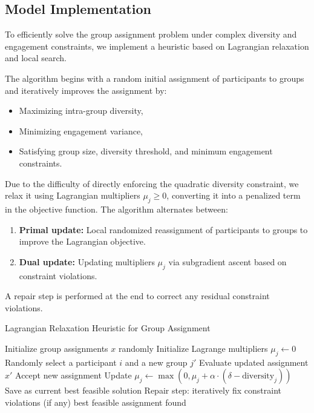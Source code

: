 \subsection*{Model Implementation}

To efficiently solve the group assignment problem under complex diversity and engagement constraints, we implement a heuristic based on Lagrangian relaxation and local search.

The algorithm begins with a random initial assignment of participants to groups and iteratively improves the assignment by:
\begin{itemize}
    \item Maximizing intra-group diversity,
    \item Minimizing engagement variance,
    \item Satisfying group size, diversity threshold, and minimum engagement constraints.
\end{itemize}

Due to the difficulty of directly enforcing the quadratic diversity constraint, we relax it using Lagrangian multipliers $\mu_j \geq 0$, converting it into a penalized term in the objective function. The algorithm alternates between:
\begin{enumerate}
    \item \textbf{Primal update:} Local randomized reassignment of participants to groups to improve the Lagrangian objective.
    \item \textbf{Dual update:} Updating multipliers $\mu_j$ via subgradient ascent based on constraint violations.
\end{enumerate}

A repair step is performed at the end to correct any residual constraint violations.

\begin{algorithm}[H]
\caption*{Lagrangian Relaxation Heuristic for Group Assignment}
\begin{algorithmic}[1]
\State Initialize group assignments $x$ randomly
\State Initialize Lagrange multipliers $\mu_j \gets 0$
        \State Randomly select a participant $i$ and a new group $j'$
            \State Evaluate updated assignment $x'$
                \State Accept new assignment
            \EndIf
        \EndIf
    \EndFor
        \State Update $\mu_j \gets \max(0, \mu_j + \alpha \cdot (\delta - \text{diversity}_j))$
    \EndFor
        \State Save as current best feasible solution
    \EndIf
\EndFor
\State Repair step: iteratively fix constraint violations (if any)
\State \Return best feasible assignment found
\end{algorithmic}
\end{algorithm}
